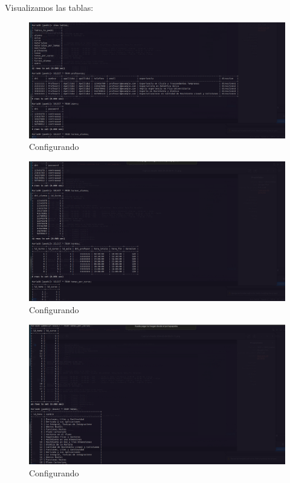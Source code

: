 Visualizamos las tablas:
\begin{figure}[H]
  \centering
  \includegraphics[width=1.0\textwidth]{img/Viendo_Datos_6.png}
  \caption{Configurando}
\end{figure}
\begin{figure}[H]
  \centering
  \includegraphics[width=1.0\textwidth]{img/Viendo_Datos_5.png}
  \caption{Configurando}
\end{figure}
\begin{figure}[H]
  \centering
  \includegraphics[width=1.0\textwidth]{img/Viendo_Datos_4.png}
  \caption{Configurando}
\end{figure}
